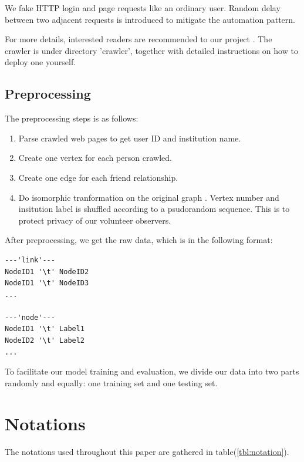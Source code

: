\documentclass[11pt,a4paper]{article}
\begin{document}
We fake HTTP login and page requests like an ordinary user. 
Random delay between two adjacent requests is introduced 
to mitigate the automation pattern. 

For more details, interested readers are recommended to 
our project \cite{hu2011-cd2hop}. The crawler is under 
directory 'crawler', together with detailed instructions 
on how to deploy one yourself. 

\subsection{Preprocessing}

The preprocessing steps is as follows:
\begin{enumerate}
	\item Parse crawled web pages to get user ID and institution name. 
	\item Create one vertex for each person crawled. 
	\item Create one edge for each friend relationship. 
	\item Do isomorphic tranformation on the original graph
	\cite{wiki_iso_graph}. Vertex number and insitution label 
	is shuffled according to a psudorandom sequence. 
	This is to protect privacy of our volunteer observers. 
\end{enumerate}

After preprocessing, we get the raw data, which is in the
following format:
\begin{Verbatim}
---'link'---
NodeID1 '\t' NodeID2
NodeID1 '\t' NodeID3
...

---'node'---
NodeID1 '\t' Label1
NodeID2 '\t' Label2
...
\end{Verbatim}

To facilitate our model training and evaluation, 
we divide our data into two parts randomly and equally: 
one training set and one testing set. 

\section{Notations}

The notations used throughout this paper are gathered 
in table(\ref{tbl:notation}). 
\end{document}
